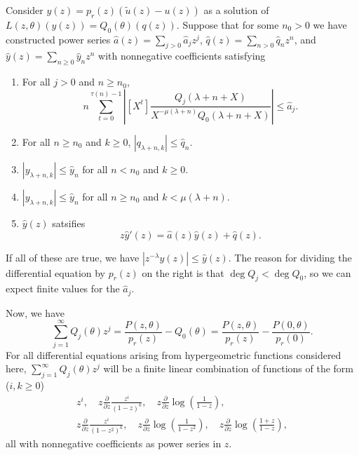 \documentclass[10pt]{article}
\numberwithin{equation}{section}
\begin{document}
Consider
$y(z) = p_r(z)(\tilde{u}(z) - u(z))$ as a solution of $L(z, \theta)(y(z)) = Q_0(\theta)(q(z))$. Suppose that for some $n_0 > 0$ we have constructed power series $\hat{a}(z) = \sum_{j>0} \hat{a}_j z^j$, $\hat{q}(z)  = \sum_{n>0} \hat{q}_n z^n$, and $\hat{y}(z) = \sum_{n \ge 0} \hat{y}_n z^n$ with nonnegative coefficients satisfying
\begin{enumerate}
\item For all $j > 0$ and $n \ge n_0$,
\begin{equation*}
n \sum_{t=0}^{\tau(n) - 1} \left| [X^t] \frac{Q_j(\lambda+n+X)}{X^{-\mu(\lambda+n)}Q_0(\lambda+n+X)} \right| \le  \hat{a}_j \text{.}
\end{equation*}
\item For all $n \ge n_0$ and $k \ge 0$, $| q_{\lambda+n,k}| \le \hat{q}_n$.
\item $|y_{\lambda+n,k}| \le \hat{y}_n$ for all $n < n_0$ and $k \ge 0$.
\item $|y_{\lambda+n,k}| \le \hat{y}_n$ for all $n \ge n_0$ and $k < \mu(\lambda + n)$.
\item $\hat{y}(z)$ satsifies
\begin{equation*}
z \hat{y}'(z) = \hat{a}(z) \hat{y}(z) + \hat{q}(z)\text{.}
\end{equation*}
\end{enumerate}
If all of these are true, we have $|z^{-\lambda} y(z)| \le \hat{y}(z)$. The reason for dividing the differential equation by $p_r(z)$ on the right is that $\deg Q_j < \deg Q_0$, so we can expect finite values for the $\hat{a}_j$.

Now, we have
\begin{equation*}
\sum_{j=1}^{\infty} Q_j(\theta) z^j = \frac{P(z,\theta)}{p_r(z)} - Q_0(\theta)
= \frac{P(z,\theta)}{p_r(z)} - \frac{P(0,\theta)}{p_r(0)} \text{.}
\end{equation*}
For all differential equations arising from hypergeometric functions considered here, $\sum_{j=1}^{\infty} Q_j(\theta) z^j$ will be a finite linear combination of functions of the form ($i, k \ge 0$)
\begin{gather*}
z^i, \quad z \frac{\partial}{\partial z} \frac{z^i}{(1-z)^k}, \quad
z \frac{\partial}{\partial z} \log \left( \frac{1}{1-z} \right),\\
z \frac{\partial}{\partial z} \frac{z^i}{(1-z^2)^k}, \quad
z \frac{\partial}{\partial z} \log \left( \frac{1}{1-z^2} \right), \quad
z \frac{\partial}{\partial z} \log \left( \frac{1+z}{1-z} \right),
\end{gather*}
all with nonnegative coefficients as power series in $z$.
\end{document}
